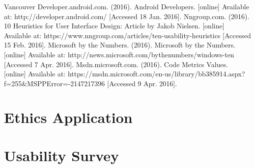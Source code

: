 \documentclass[12pt]{report}
\begin{document}
\begin{thebibliography}{15}
Vancouver
		 Developer.android.com. (2016). Android Developers. [online] Available at: http://developer.android.com/ [Accessed 18 Jan. 2016].
		 Nngroup.com. (2016). 10 Heuristics for User Interface Design: Article by Jakob Nielsen. [online] Available at: https://www.nngroup.com/articles/ten-usability-heuristics [Accessed 15 Feb. 2016].
		 Microsoft by the Numbers. (2016). Microsoft by the Numbers. [online] Available at: http://news.microsoft.com/bythenumbers/windows-ten [Accessed 7 Apr. 2016].
		 Msdn.microsoft.com. (2016). Code Metrics Values. [online] Available at: https://msdn.microsoft.com/en-us/library/bb385914.aspx?f=255{\&}MSPPError=-2147217396 [Accessed 9 Apr. 2016].
	\end{thebibliography}
		
	\newpage
	
	\begin{appendix}
		\chapter{Ethics Application}{
			
			\label{app:Ethics}
		}
		\chapter{Usability Survey}{
			
			\label{app:Survey}
		}
	\end{appendix}
\end{document}

